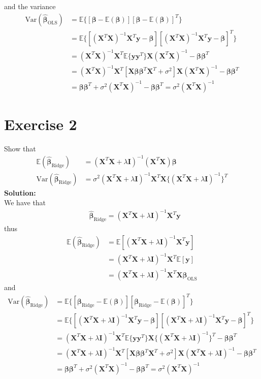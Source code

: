 \documentclass{article}
\begin{document}
	and the variance
	\begin{align*}
			\text{Var}(\hat{\bm\beta}_\text{OLS})&=\mathbb E\{ [\bm\beta-\mathbb E(\bm\beta)] [\bm\beta-\mathbb E(\bm\beta)]^T\}\\
			&=\mathbb E\{ [(\bm X^T\bm X)^{-1}\bm X^T\bm y-\bm\beta][(\bm X^T\bm X)^{-1}\bm X^T\bm y-\bm\beta]^T\}\\
			&=(\bm X^T\bm X)^{-1}\bm X^T\mathbb E\{\bm y\bm y^T\}\bm X(\bm X^T\bm X)^{-1}-\bm\beta\bm\beta^T\\
			&=(\bm X^T\bm X)^{-1}\bm X^T[\bm X\bm\beta\bm\beta^T\bm X^T+\sigma^2]\bm X(\bm X^T\bm X)^{-1}-\bm\beta\bm\beta^T\\
			&=\bm\beta\bm\beta^T+\sigma^2(\bm X^T\bm X)^{-1}-\bm\beta\bm\beta^T=\sigma^2(\bm X^T \bm X)^{-1}
	\end{align*}
	
	
	\section*{Exercise 2}
	Show that
	\begin{align*}
		\mathbb{E}(\hat{\bm \beta}_\text{Ridge})&=(\bm X^T\bm X+\lambda\bm I)^{-1}(\bm X^T\bm X)\bm\beta\\
		\text{Var}(\hat{\bm \beta}_\text{Ridge})&=\sigma^2(\bm X^T \bm X+\lambda\bm I)^{-1}\bm X^T\bm X\{(\bm X^T \bm X+\lambda\bm I)^{-1}\}^T
	\end{align*}
	\textbf{Solution:}\\
	We have that
	\begin{align*}
		&\hat{\bm \beta}_\text{Ridge}=(\bm{X}^T\bm{X}+\lambda\bm{I})^{-1}\bm{X}^T\bm{y}
	\end{align*}
	thus
	\begin{align*}
		\mathbb{E}(\hat{\bm \beta}_\text{Ridge})&=\mathbb{E}[(\bm{X}^T\bm{X}+\lambda\bm{I})^{-1}\bm{X}^T\bm{y}]\\
		&=(\bm{X}^T\bm{X}+\lambda\bm{I})^{-1}\bm{X}^T\mathbb{E}[\bm{y}]\\
		&=(\bm{X}^T\bm{X}+\lambda\bm{I})^{-1}\bm{X}^T\bm X\bm\beta_\text{OLS}
	\end{align*}
	and
	\begin{align*}
		\text{Var}(\hat{\bm \beta}_\text{Ridge})&=\mathbb E\{ [\bm\beta_\text{Ridge}-\mathbb E(\bm\beta)] [\bm\beta_\text{Ridge}-\mathbb E(\bm\beta)]^T\}\\
		&=\mathbb E\{ [(\bm{X}^T\bm{X}+\lambda\bm{I})^{-1}\bm{X}^T\bm{y}-\bm\beta][(\bm{X}^T\bm{X}+\lambda\bm{I})^{-1}\bm{X}^T\bm{y}-\bm\beta]^T\}\\
		&=(\bm X^T\bm X+\lambda\bm{I})^{-1}\bm X^T\mathbb E\{\bm y\bm y^T\}\bm X\{(\bm X^T\bm X+\lambda\bm{I})^{-1}\}^T-\bm\beta\bm\beta^T\\
		&=(\bm X^T\bm X+\lambda\bm{I})^{-1}\bm X^T[\bm X\bm\beta\bm\beta^T\bm X^T+\sigma^2]\bm X(\bm X^T\bm X+\lambda\bm{I})^{-1}-\bm\beta\bm\beta^T\\
		&=\bm\beta\bm\beta^T+\sigma^2(\bm X^T\bm X)^{-1}-\bm\beta\bm\beta^T=\sigma^2(\bm X^T \bm X)^{-1}
	\end{align*}
	
	
	
\end{document}
